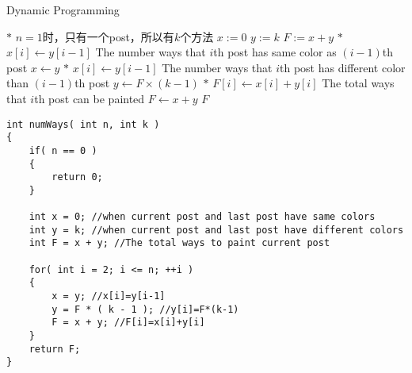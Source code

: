 \begin{algorithm}[H]
\caption{Dynamic Programming}
\begin{algorithmic}[1]
\State {}
\EndIf
\State $\ast$ $n=1$时，只有一个post，所以有$k$个方法
\State $x:=0$
\State $y:=k$
\State $F:=x+y$
\State $\ast$ $x[i]\gets y[i-1]$ The number ways that $i$th post has same color as $(i-1)$th post
\State $x\gets y$ 
\State $\ast$ $x[i]\gets y[i-1]$ The number ways that $i$th post has different color than $(i-1)$th post
\State $y\gets F\times (k-1)$ 
\State $\ast$ $F[i]\gets x[i]+y[i]$ The total ways that $i$th post can be painted
\State $F\gets x+y$ 
\EndFor
\State \Return $F$
\EndProcedure
\end{algorithmic}
\end{algorithm}
\setcounter{lstlisting}{0}
\begin{lstlisting}[style=customc, caption={Dynamic Programming}]
int numWays( int n, int k )
{
    if( n == 0 )
    {
        return 0;
    }

    int x = 0; //when current post and last post have same colors
    int y = k; //when current post and last post have different colors
    int F = x + y; //The total ways to paint current post

    for( int i = 2; i <= n; ++i )
    {
        x = y; //x[i]=y[i-1]
        y = F * ( k - 1 ); //y[i]=F*(k-1)
        F = x + y; //F[i]=x[i]+y[i]
    }
    return F;
}
\end{lstlisting}